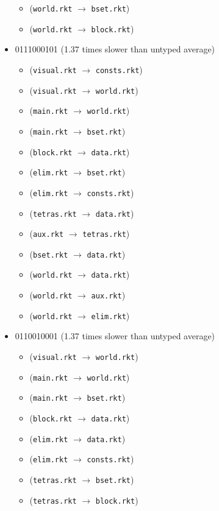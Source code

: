 \documentclass{article}
\newcommand{\mono}[1]{\texttt{#1}}
\begin{document}
\begin{itemize}
\begin{itemize}
  \item (\mono{world.rkt} $\rightarrow$ \mono{bset.rkt})
  \item (\mono{world.rkt} $\rightarrow$ \mono{block.rkt})
  \end{itemize}
\item 0111000101 (1.37 times slower than untyped average)
  \begin{itemize}
  \item (\mono{visual.rkt} $\rightarrow$ \mono{consts.rkt})
  \item (\mono{visual.rkt} $\rightarrow$ \mono{world.rkt})
  \item (\mono{main.rkt} $\rightarrow$ \mono{world.rkt})
  \item (\mono{main.rkt} $\rightarrow$ \mono{bset.rkt})
  \item (\mono{block.rkt} $\rightarrow$ \mono{data.rkt})
  \item (\mono{elim.rkt} $\rightarrow$ \mono{bset.rkt})
  \item (\mono{elim.rkt} $\rightarrow$ \mono{consts.rkt})
  \item (\mono{tetras.rkt} $\rightarrow$ \mono{data.rkt})
  \item (\mono{aux.rkt} $\rightarrow$ \mono{tetras.rkt})
  \item (\mono{bset.rkt} $\rightarrow$ \mono{data.rkt})
  \item (\mono{world.rkt} $\rightarrow$ \mono{data.rkt})
  \item (\mono{world.rkt} $\rightarrow$ \mono{aux.rkt})
  \item (\mono{world.rkt} $\rightarrow$ \mono{elim.rkt})
  \end{itemize}
\item 0110010001 (1.37 times slower than untyped average)
  \begin{itemize}
  \item (\mono{visual.rkt} $\rightarrow$ \mono{world.rkt})
  \item (\mono{main.rkt} $\rightarrow$ \mono{world.rkt})
  \item (\mono{main.rkt} $\rightarrow$ \mono{bset.rkt})
  \item (\mono{block.rkt} $\rightarrow$ \mono{data.rkt})
  \item (\mono{elim.rkt} $\rightarrow$ \mono{data.rkt})
  \item (\mono{elim.rkt} $\rightarrow$ \mono{consts.rkt})
  \item (\mono{tetras.rkt} $\rightarrow$ \mono{bset.rkt})
  \item (\mono{tetras.rkt} $\rightarrow$ \mono{block.rkt})

\end{itemize}
\end{itemize}
\end{document}
